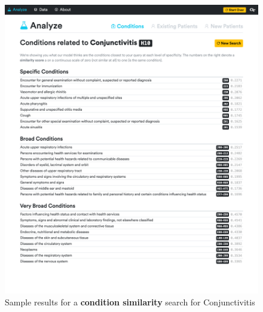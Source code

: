 \documentclass[twoside,11pt]{article}
\begin{document}
{\begin{figure}[H]
  \includegraphics[width=\textwidth]{./images/website-screenshot-1.png}
  \caption{Sample results for a \textbf{condition similarity} search for Conjunctivitis}
\end{figure}

}
\end{document}
